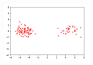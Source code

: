 \documentclass[a4paper]{article}
\theoremstyle{definition}
\newenvironment{soln}{
	\leavevmode\color{blue}\ignorespaces
}{}
\begin{document}
\begin{enumerate}
		\begin{soln}
		\begin{figure}[h!]
		    \centering
		    \includegraphics[width=0.4\textwidth]{Figure5.png}  
		    \captionsetup{labelformat=empty}
		    \caption{}
		    \label{fig:my_label}
		\end{figure}
	\end{soln}
	\end{enumerate}
	
	
	
	
	
	
	
\end{document}
